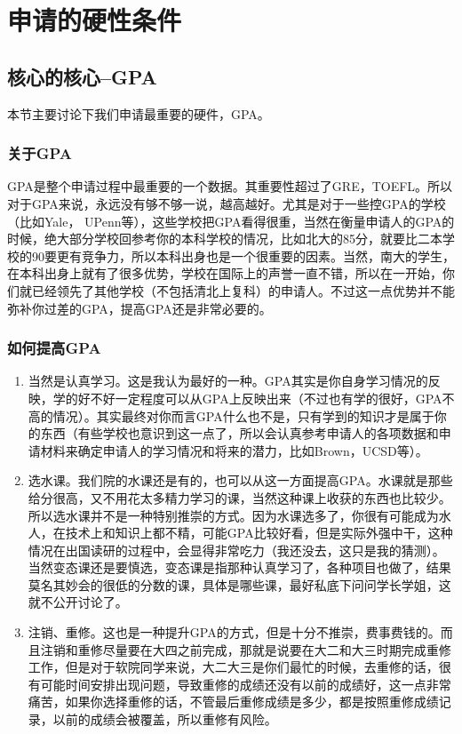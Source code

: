 \chapter{申请的硬性条件}
\newpage
\section{核心的核心--GPA}
本节主要讨论下我们申请最重要的硬件，GPA。
\subsection{关于GPA}

GPA是整个申请过程中最重要的一个数据。其重要性超过了GRE，TOEFL。所以对于GPA来说，永远没有够不够一说，越高越好。尤其是对于一些控GPA的学校（比如Yale， UPenn等），这些学校把GPA看得很重，当然在衡量申请人的GPA的时候，绝大部分学校回参考你的本科学校的情况，比如北大的85分，就要比二本学校的90要更有竞争力，所以本科出身也是一个很重要的因素。当然，南大的学生，在本科出身上就有了很多优势，学校在国际上的声誉一直不错，所以在一开始，你们就已经领先了其他学校（不包括清北上复科）的申请人。不过这一点优势并不能弥补你过差的GPA，提高GPA还是非常必要的。

\subsection{如何提高GPA}
\begin{enumerate}
\item 当然是认真学习。这是我认为最好的一种。GPA其实是你自身学习情况的反映，学的好不好一定程度可以从GPA上反映出来（不过也有学的很好，GPA不高的情况）。其实最终对你而言GPA什么也不是，只有学到的知识才是属于你的东西（有些学校也意识到这一点了，所以会认真参考申请人的各项数据和申请材料来确定申请人的学习情况和将来的潜力，比如Brown，UCSD等）。

\item 选水课。我们院的水课还是有的，也可以从这一方面提高GPA。水课就是那些给分很高，又不用花太多精力学习的课，当然这种课上收获的东西也比较少。所以选水课并不是一种特别推崇的方式。因为水课选多了，你很有可能成为水人，在技术上和知识上都不精，可能GPA比较好看，但是实际外强中干，这种情况在出国读研的过程中，会显得非常吃力（我还没去，这只是我的猜测）。当然变态课还是要慎选，变态课是指那种认真学习了，各种项目也做了，结果莫名其妙会的很低的分数的课，具体是哪些课，最好私底下问问学长学姐，这就不公开讨论了。

\item 注销、重修。这也是一种提升GPA的方式，但是十分不推崇，费事费钱的。而且注销和重修尽量要在大四之前完成，那就是说要在大二和大三时期完成重修工作，但是对于软院同学来说，大二大三是你们最忙的时候，去重修的话，很有可能时间安排出现问题，导致重修的成绩还没有以前的成绩好，这一点非常痛苦，如果你选择重修的话，不管最后重修成绩是多少，都是按照重修成绩记录，以前的成绩会被覆盖，所以重修有风险。
\end{enumerate}

